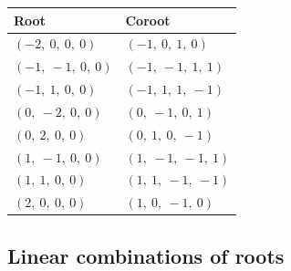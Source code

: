 \documentclass[11pt]{article}
\theoremstyle{definition}
\newif\ifsummablepairs
\begin{document}
\noindent \begin{tabular}{|l|l|}
    \hline
    \textbf{Root} & \textbf{Coroot} \\
    \hline
    $\left( -2, \  0, \  0, \  0\right)$ & $\left( -1, \  0, \  1, \  0\right)$ \\
    \hline
    $\left( -1, \  -1, \  0, \  0\right)$ & $\left( -1, \  -1, \  1, \  1\right)$ \\
    \hline
    $\left( -1, \  1, \  0, \  0\right)$ & $\left( -1, \  1, \  1, \  -1\right)$ \\
    \hline
    $\left( 0, \  -2, \  0, \  0\right)$ & $\left( 0, \  -1, \  0, \  1\right)$ \\
    \hline
    $\left( 0, \  2, \  0, \  0\right)$ & $\left( 0, \  1, \  0, \  -1\right)$ \\
    \hline
    $\left( 1, \  -1, \  0, \  0\right)$ & $\left( 1, \  -1, \  -1, \  1\right)$ \\
    \hline
    $\left( 1, \  1, \  0, \  0\right)$ & $\left( 1, \  1, \  -1, \  -1\right)$ \\
    \hline
    $\left( 2, \  0, \  0, \  0\right)$ & $\left( 1, \  0, \  -1, \  0\right)$ \\
    \hline
\end{tabular}


\ifsummablepairs
\subsection{Linear combinations of roots}
\end{document}
